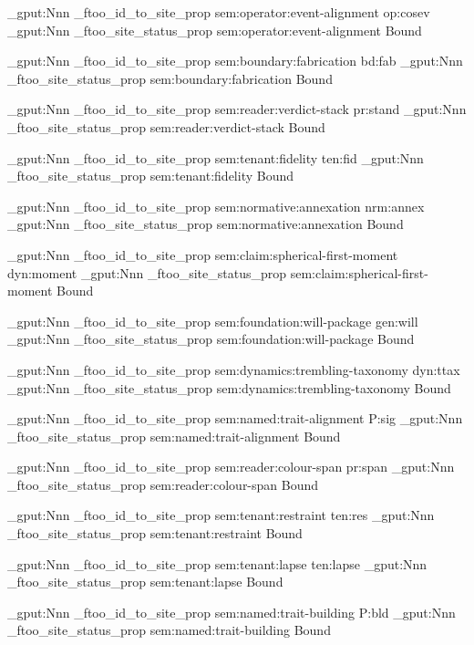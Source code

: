\prop_gput:Nnn \g_ftoo_id_to_site_prop { sem:operator:event-alignment } { op:cosev }
\prop_gput:Nnn \g_ftoo_site_status_prop { sem:operator:event-alignment } { Bound }

\prop_gput:Nnn \g_ftoo_id_to_site_prop { sem:boundary:fabrication } { bd:fab }
\prop_gput:Nnn \g_ftoo_site_status_prop { sem:boundary:fabrication } { Bound }

\prop_gput:Nnn \g_ftoo_id_to_site_prop { sem:reader:verdict-stack } { pr:stand }
\prop_gput:Nnn \g_ftoo_site_status_prop { sem:reader:verdict-stack } { Bound }

\prop_gput:Nnn \g_ftoo_id_to_site_prop { sem:tenant:fidelity } { ten:fid }
\prop_gput:Nnn \g_ftoo_site_status_prop { sem:tenant:fidelity } { Bound }

\prop_gput:Nnn \g_ftoo_id_to_site_prop { sem:normative:annexation } { nrm:annex }
\prop_gput:Nnn \g_ftoo_site_status_prop { sem:normative:annexation } { Bound }

\prop_gput:Nnn \g_ftoo_id_to_site_prop { sem:claim:spherical-first-moment } { dyn:moment }
\prop_gput:Nnn \g_ftoo_site_status_prop { sem:claim:spherical-first-moment } { Bound }

\prop_gput:Nnn \g_ftoo_id_to_site_prop { sem:foundation:will-package } { gen:will }
\prop_gput:Nnn \g_ftoo_site_status_prop { sem:foundation:will-package } { Bound }

\prop_gput:Nnn \g_ftoo_id_to_site_prop { sem:dynamics:trembling-taxonomy } { dyn:ttax }
\prop_gput:Nnn \g_ftoo_site_status_prop { sem:dynamics:trembling-taxonomy } { Bound }

\prop_gput:Nnn \g_ftoo_id_to_site_prop { sem:named:trait-alignment } { P:sig }
\prop_gput:Nnn \g_ftoo_site_status_prop { sem:named:trait-alignment } { Bound }

\prop_gput:Nnn \g_ftoo_id_to_site_prop { sem:reader:colour-span } { pr:span }
\prop_gput:Nnn \g_ftoo_site_status_prop { sem:reader:colour-span } { Bound }

\prop_gput:Nnn \g_ftoo_id_to_site_prop { sem:tenant:restraint } { ten:res }
\prop_gput:Nnn \g_ftoo_site_status_prop { sem:tenant:restraint } { Bound }

\prop_gput:Nnn \g_ftoo_id_to_site_prop { sem:tenant:lapse } { ten:lapse }
\prop_gput:Nnn \g_ftoo_site_status_prop { sem:tenant:lapse } { Bound }

\prop_gput:Nnn \g_ftoo_id_to_site_prop { sem:named:trait-building } { P:bld }
\prop_gput:Nnn \g_ftoo_site_status_prop { sem:named:trait-building } { Bound }

